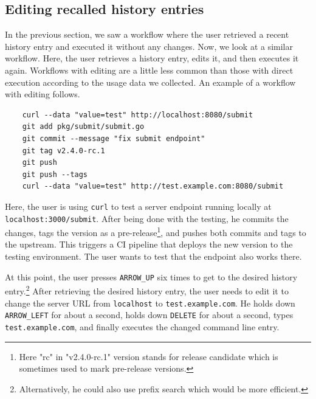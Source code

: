 



\subsection{Editing recalled history entries}

In the previous section, we saw a workflow where the user retrieved a recent history entry and executed it without any changes. Now, we look at a similar workflow. Here, the user retrieves a history entry, edits it, and then executes it again. Workflows with editing are a little less common than those with direct execution according to the usage data we collected. An example of a workflow with editing follows.

\begin{verbatim}
    curl --data "value=test" http://localhost:8080/submit
    git add pkg/submit/submit.go
    git commit --message "fix submit endpoint"
    git tag v2.4.0-rc.1
    git push
    git push --tags
    curl --data "value=test" http://test.example.com:8080/submit
\end{verbatim}


Here, the user is using \verb|curl| to test a server endpoint running locally at \verb|localhost:3000/submit|. After being done with the testing, he commits the changes, tags the version as a pre-release\footnote{Here "rc" in "v2.4.0-rc.1" version stands for release candidate which is sometimes used to mark pre-release versions.}, and pushes both commits and tags to the upstream. This triggers a CI pipeline that deploys the new version to the testing environment. The user wants to test that the endpoint also works there.

At this point, the user presses \verb|ARROW_UP| six times to get to the desired history entry.\footnote{Alternatively, he could also use prefix search which would be more efficient.} 
After retrieving the desired history entry, the user needs to edit it to change the server URL from \verb|localhost| to \verb|test.example.com|. He holds down \verb|ARROW_LEFT| for about a second, holds down \verb|DELETE| for about a second, types \verb|test.example.com|, and finally executes the changed command line entry. 

